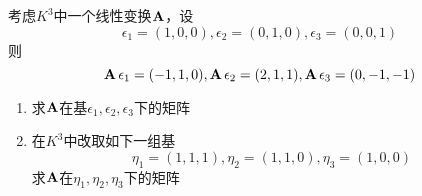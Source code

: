 \documentclass[11pt]{article}
\begin{document}
\begin{enumerate}
\begin{proposition}[]
考虑\(K^3\)中一个线性变换\(\operatorname{\textbf{A}}\)，设
\begin{equation*}
\epsilon_1=(1,0,0),\epsilon_2=(0,1,0),\epsilon_3=(0,0,1)
\end{equation*}
则
\begin{equation*}
\operatorname{\textbf{A}}\epsilon_1=(-1,1,0),\operatorname{\textbf{A}}\epsilon_2=(2,1,1),\operatorname{\textbf{A}}\epsilon_3=(0,-1,-1)
\end{equation*}
\begin{enumerate}
\item 求\(\operatorname{\textbf{A}}\)在基\(\epsilon_1,\epsilon_2,\epsilon_3\)下的矩阵
\item 在\(K^3\)中改取如下一组基
\begin{equation*}
\eta_1=(1,1,1),\eta_2=(1,1,0),\eta_3=(1,0,0)
\end{equation*}
求\(\operatorname{\textbf{A}}\)在\(\eta_1,\eta_2,\eta_3\)下的矩阵
\end{enumerate}
\end{proposition}


\end{enumerate}
\end{document}
